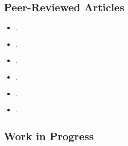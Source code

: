 \subsection*{Peer-Reviewed Articles}


\begin{itemize}

	\item[\textcolor{gray}{\textbullet}] \href{https://doi.org/10.1016/j.electstud.2022.102497}{}.

	\item[\textcolor{gray}{\textbullet}] \href{https://link.springer.com/article/10.1057/s41269-020-00174-4}{}.

	\item[\textcolor{gray}{\textbullet}] \href{https://doi.org/10.1016/j.ejpoleco.2021.102048}{}.

	\item[\textcolor{gray}{\textbullet}] \href{https://doi.org/10.1111/rsp3.12337}{}.

	\item[\textcolor{gray}{\textbullet}] \href{https://doi.org/10.1177/1866802X1801000202}{}.

	\item[\textcolor{gray}{\textbullet}] \href{https://scielo.conicyt.cl/pdf/revcipol/v31n2/art07.pdf}{}.
  
\end{itemize}







\subsection*{Work in Progress}


